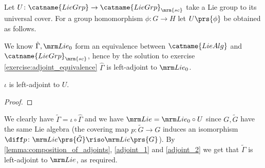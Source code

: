 \documentclass[10pt]{article}
\begin{document}
\begin{solution}
Let $U \colon \catname{LieGrp} \to \catname{LieGrp}_{\mrm{sc}}$ take a Lie group to its universal cover. For a group homomorphism $\phi \colon G \to H$ let $U\prs{\phi}$ be obtained as follows.

\begin{remark}\label{adjoint_1}
We know $\hat{\Gamma}, \Lie_0$ form an equivalence between $\catname{LieAlg}$ and $\catname{LieGrp}_{\mrm{sc}}$, hence by the solution to exercise \ref{exercise:adjoint_equivalence} $\hat{\Gamma}$ is left-adjoint to $\Lie_0$.
\end{remark}

\begin{lemma}\label{adjoint_2}
$\iota$ is left-adjoint to $U$.
\end{lemma}

\begin{proof}
\end{proof}

We clearly have $\tilde{\Gamma} = \iota \circ \hat{\Gamma}$ and we have $\Lie = \Lie_0 \circ U$ since $G, \tilde{G}$ have the same Lie algebra (the covering map $p \colon \tilde{G} \to G$ induces an isomorphism $\diff p \colon \Lie\prs{\tilde{G}} \riso \Lie\prs{G}$).
By \eqref{lemma:composition_of_adjoints}, \eqref{adjoint_1} and \eqref{adjoint_2} we get that $\tilde{\Gamma}$ is left-adjoint to $\Lie$, as required.
\end{solution}
\end{document}
